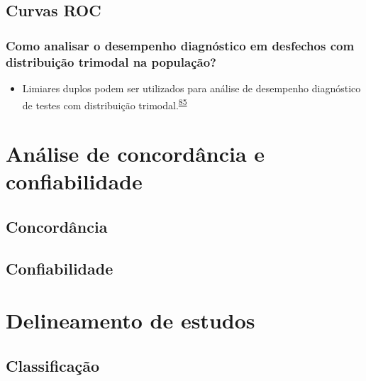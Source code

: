 \documentclass[
]{book}
\providecommand{\tightlist}{%
  \setlength{\itemsep}{0pt}\setlength{\parskip}{0pt}}
\begin{document}
\hypertarget{curvas-roc}{%
\section{Curvas ROC}\label{curvas-roc}}

\hypertarget{como-analisar-o-desempenho-diagnuxf3stico-em-desfechos-com-distribuiuxe7uxe3o-trimodal-na-populauxe7uxe3o}{%
\subsection{Como analisar o desempenho diagnóstico em desfechos com distribuição trimodal na população?}\label{como-analisar-o-desempenho-diagnuxf3stico-em-desfechos-com-distribuiuxe7uxe3o-trimodal-na-populauxe7uxe3o}}

\begin{itemize}
\tightlist
\item
  Limiares duplos podem ser utilizados para análise de desempenho diagnóstico de testes com distribuição trimodal.\textsuperscript{\protect\hyperlink{ref-ferreira2021}{85}}
\end{itemize}

\hypertarget{analise-concordancia-confiabilidade}{%
\chapter{\texorpdfstring{\textbf{Análise de concordância e confiabilidade}}{Análise de concordância e confiabilidade}}\label{analise-concordancia-confiabilidade}}

\hypertarget{concordancia}{%
\section{Concordância}\label{concordancia}}

\hypertarget{confiabilidade}{%
\section{Confiabilidade}\label{confiabilidade}}

\hypertarget{delineamento-estudos}{%
\chapter{\texorpdfstring{\textbf{Delineamento de estudos}}{Delineamento de estudos}}\label{delineamento-estudos}}

\hypertarget{classificacao}{%
\section{Classificação}\label{classificacao}}
\end{document}
